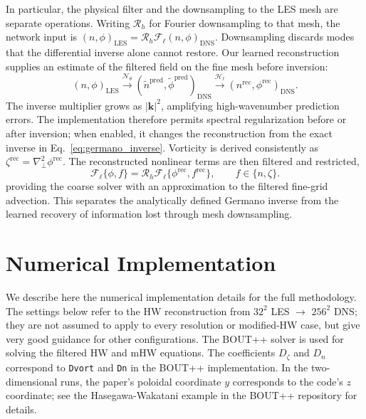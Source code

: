 \documentclass[authoryear,preprint,review,12pt]{elsarticle}
\begin{document}
In particular, the physical filter and the downsampling to the LES mesh are separate operations. Writing $\mathcal{R}_h$ for Fourier downsampling to that mesh, the network input is $(n,\phi)_{\mathrm{LES}}=\mathcal{R}_h\mathcal{F}_\ell(n,\phi)_{\mathrm{DNS}}$. Downsampling discards modes that the differential inverse alone cannot restore. Our learned reconstruction supplies an estimate of the filtered field on the fine mesh before inversion:
\begin{equation}
    (n,\phi)_{\mathrm{LES}}
    \xrightarrow{\mathcal{N}_\theta}
    (\widetilde n^{\mathrm{pred}},\widetilde\phi^{\mathrm{pred}})_{\mathrm{DNS}}
    \xrightarrow{\mathcal{H}_\ell}
    (n^{\mathrm{rec}},\phi^{\mathrm{rec}})_{\mathrm{DNS}}.
    \label{eq:germano_learning_path}
\end{equation}
The inverse multiplier grows as $|\mathbf{k}|^2$, amplifying high-wavenumber prediction errors. The implementation therefore permits spectral regularization before or after inversion; when enabled, it changes the reconstruction from the exact inverse in Eq.~\eqref{eq:germano_inverse}. Vorticity is derived consistently as $\zeta^{\mathrm{rec}}=\nabla_\perp^2\phi^{\mathrm{rec}}$. The reconstructed nonlinear terms are then filtered and restricted,
\begin{equation}
    \mathcal{F}_\ell\{\phi,f\}
    =\mathcal{R}_h\mathcal{F}_\ell
      \{\phi^{\mathrm{rec}},f^{\mathrm{rec}}\},
      \qquad f\in\{n,\zeta\}.
\end{equation}
providing the coarse solver with an approximation to the filtered fine-grid advection. This separates the analytically defined Germano inverse from the learned recovery of information lost through mesh downsampling.
%
%
%
%
%
%
%
\section{Numerical Implementation}\label{sec:NumericalImplementation}
We describe here the numerical implementation details for the full methodology. The settings below refer to the HW reconstruction from $32^2$ LES $\to$ $256^2$ DNS; they are not assumed to apply to every resolution or modified-HW case, but give very good guidance for other configurations. The BOUT++ solver \citep{dudson_bout++_2009} is used for solving the filtered HW and mHW equations. The coefficients $D_\zeta$ and $D_n$ correspond to \texttt{Dvort} and \texttt{Dn} in the BOUT++ implementation. In the two-dimensional runs, the paper's poloidal coordinate $y$ corresponds to the code's $z$ coordinate; see the Hasegawa-Wakatani example in the BOUT++ repository for details.
\end{document}
